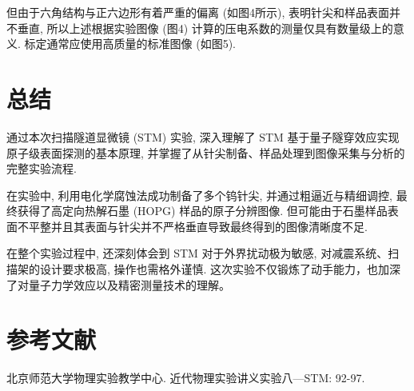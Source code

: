 \documentclass[12pt]{ctexart} %
\begin{document}
但由于六角结构与正六边形有着严重的偏离 (如图4所示), 表明针尖和样品表面并不垂直, 所以上述根据实验图像 (图4) 计算的压电系数的测量仅具有数量级上的意义. 标定通常应使用高质量的标准图像 (如图5).

\section{总结}
通过本次扫描隧道显微镜 (STM) 实验, 深入理解了 STM 基于量子隧穿效应实现原子级表面探测的基本原理, 并掌握了从针尖制备、样品处理到图像采集与分析的完整实验流程.

在实验中, 利用电化学腐蚀法成功制备了多个钨针尖, 并通过粗逼近与精细调控, 最终获得了高定向热解石墨 (HOPG) 样品的原子分辨图像. 但可能由于石墨样品表面不平整并且其表面与针尖并不严格垂直导致最终得到的图像清晰度不足.

在整个实验过程中, 还深刻体会到 STM 对于外界扰动极为敏感, 对减震系统、扫描架的设计要求极高, 操作也需格外谨慎. 这次实验不仅锻炼了动手能力，也加深了对量子力学效应以及精密测量技术的理解。

\section*{参考文献} %
\begin{thebibliography}{9} %
  北京师范大学物理实验教学中心. 近代物理实验讲义实验八---STM: 92-97. %
\end{thebibliography}
\end{document}
